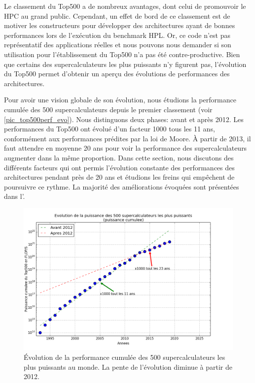     Le classement du Top500 a de nombreux avantages, dont celui de promouvoir le HPC au grand public. Cependant, un effet de bord de ce classement est de motiver les constructeurs pour développer des architectures ayant de bonnes performances lors de l'exécution du benchmark HPL. Or, ce code n'est pas représentatif des applications réelles et nous pouvons nous demander si son utilisation pour l'établissement du Top500 n'a pas été contre-productive. Bien que certains des supercalculateurs les plus puissants n'y figurent pas, l'évolution du Top500 permet d'obtenir un aperçu des évolutions de performances des architectures.
    
    Pour avoir une vision globale de son évolution, nous étudions la performance cumulée des 500 supercalculateurs depuis le premier classement (voir \autoref{pic_top500perf_evo}). Nous distinguons deux phases: avant et après 2012. 
    Les performances du Top500 ont évolué d'un facteur 1000 tous les 11 ans, conformément aux performances prédites par la loi de Moore. À partir de 2013, il faut attendre en moyenne 20 ans pour voir la performance des supercalculateurs augmenter dans la même proportion.
    Dans cette section, nous discutons des différents facteurs qui ont permis l'évolution constante des performances des architectures pendant près de 20 ans et étudions les freins qui empêchent de poursuivre ce rythme. La majorité des améliorations évoquées sont présentées dans l'.

    
    \begin{figure}
        \center
        \includegraphics[width=12cm]{images/top500_evolution.png}
        \caption{\label{pic_top500perf_evo} Évolution de la performance cumulée des 500 supercalculateurs les plus puissants au monde. La pente de l'évolution diminue à partir de 2012.}
    \end{figure}


